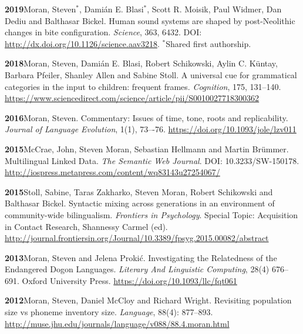 \documentclass[11pt]{article}
\newcommand{\hangpara}{
 \setlength{\parindent}{0in} %
 \hangindent=0.42in %
}
\begin{document}
\hangpara
{\bf 2019}\hspace{1ex}Moran, Steven$^*$, Dami{\'a}n E. Blasi$^*$, Scott R. Moisik, Paul Widmer, Dan Dediu and Balthasar Bickel. Human sound systems are shaped by post-Neolithic changes in bite configuration. \textit{Science}, 363, 6432. DOI: \url{http://dx.doi.org/10.1126/science.aav3218}. $^*$Shared first authorship.

\hangpara
\vskip 6pt
{\bf 2018}\hspace{1ex}Moran, Steven, Dami{\'a}n E. Blasi, Robert Schikowski, Aylin C. K{\"u}ntay, Barbara Pfeiler, Shanley Allen and Sabine Stoll. A universal cue for grammatical categories in the input to children: frequent frames. \textit{Cognition}, 175, 131--140. \url{https://www.sciencedirect.com/science/article/pii/S0010027718300362}

\hangpara
\vskip 6pt
{\bf 2016}\hspace{1ex}Moran, Steven. Commentary: Issues of time, tone, roots and replicability. \textit{Journal of Language Evolution}, 1(1), 73–-76. \url{https://doi.org/10.1093/jole/lzv011}

\hangpara
\vskip 6pt
{\bf 2015}\hspace{1ex}McCrae, John, Steven Moran, Sebastian Hellmann and Martin Br{\"u}mmer. Multilingual Linked Data. \textit{The Semantic Web Journal}. DOI: 10.3233/SW-150178. \url{http://iospress.metapress.com/content/wq83143u27254067/}

\vskip 6pt
\hangpara
{\bf 2015}\hspace{1ex}Stoll, Sabine, Taras Zakharko, Steven Moran, Robert Schikowski and Balthasar Bickel. Syntactic mixing across generations in an environment of community-wide bilingualism. \textit{Frontiers in Psychology}. Special Topic: Acquisition in Contact Research, Shannessy Carmel (ed). \url{http://journal.frontiersin.org/Journal/10.3389/fpsyg.2015.00082/abstract}

\vskip 6pt
\hangpara
{\bf 2013}\hspace{1ex}Moran, Steven and Jelena Proki{\'c}. Investigating the Relatedness of the Endangered Dogon Languages. \textit{Literary And Linguistic Computing}, 28(4) 676--691. Oxford University Press. \url{https://doi.org/10.1093/llc/fqt061}

\vskip 6pt
\hangpara
{\bf 2012}\hspace{1ex}Moran, Steven, Daniel McCloy and Richard Wright. Revisiting population size vs phoneme inventory size. {\it Language}, 88(4): 877--893. \url{http://muse.jhu.edu/journals/language/v088/88.4.moran.html}
\end{document}
